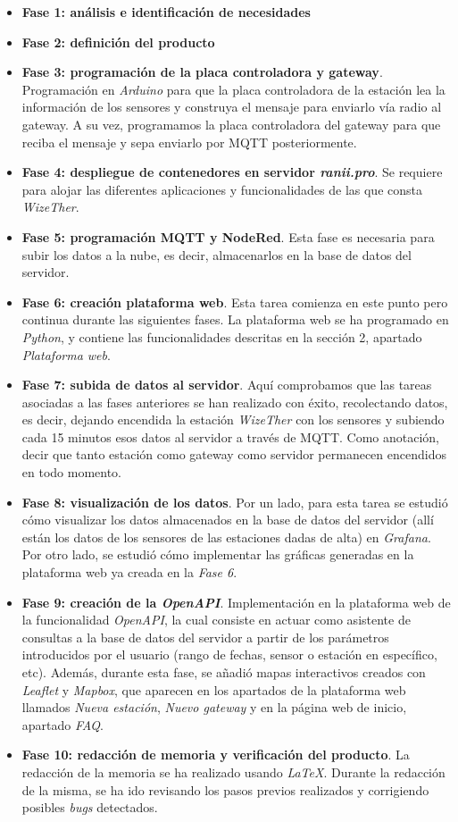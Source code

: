 \documentclass[12pt]{article}
\begin{document}
\begin{itemize}
	\item \textbf{Fase 1: análisis e identificación de necesidades}
	\item \textbf{Fase 2: definición del producto}
	\item \textbf{Fase 3: programación de la placa controladora y gateway}. Programación en \textit{Arduino} para que la placa controladora de la estación lea la información de los sensores y construya el mensaje para enviarlo vía radio al gateway. A su vez, programamos la placa controladora del gateway para que reciba el mensaje y sepa enviarlo por MQTT posteriormente.
	\item \textbf{Fase 4: despliegue de contenedores en servidor \textit{ranii.pro}}. Se requiere para alojar las diferentes aplicaciones y funcionalidades de las que consta \textit{WizeTher}.
	\item  \textbf{Fase 5: programación MQTT y NodeRed}. Esta fase es necesaria para subir los datos a la nube, es decir, almacenarlos en la base de datos del servidor.
	\item \textbf{Fase 6: creación plataforma web}. Esta tarea comienza en este punto pero continua durante las siguientes fases. La plataforma web se ha programado en \textit{Python}, y contiene las funcionalidades descritas en la sección 2, apartado \textit{Plataforma web}.
	\item \textbf{Fase 7: subida de datos al servidor}. Aquí comprobamos que las tareas asociadas a las fases anteriores se han realizado con éxito, recolectando datos, es decir, dejando encendida la estación \textit{WizeTher} con los sensores y subiendo cada 15 minutos esos datos al servidor a través de MQTT. Como anotación, decir que tanto estación como gateway como servidor permanecen encendidos en todo momento.
	\item \textbf{Fase 8: visualización de los datos}. Por un lado, para esta tarea se estudió cómo visualizar los datos almacenados en la base de datos del servidor (allí están los datos de los sensores de las estaciones dadas de alta) en \textit{Grafana}. Por otro lado, se estudió cómo implementar las gráficas generadas en la plataforma web ya creada en la \textit{Fase 6}.
	\item \textbf{Fase 9: creación de la \textit{OpenAPI}}. Implementación en la plataforma web de la funcionalidad \textit{OpenAPI}, la cual consiste en actuar como asistente de consultas a la base de datos del servidor a partir de los parámetros introducidos por el usuario (rango de fechas, sensor o estación en específico, etc). Además, durante esta fase, se añadió mapas interactivos creados con \textit{Leaflet} y \textit{Mapbox}, que aparecen en los apartados de la plataforma web llamados \textit{Nueva estación}, \textit{Nuevo gateway} y en la página web de inicio, apartado \textit{FAQ}.
	\item \textbf{Fase 10: redacción de memoria y verificación del producto}. La redacción de la memoria se ha realizado usando \textit{LaTeX}. Durante la redacción de la misma, se ha ido revisando los pasos previos realizados y corrigiendo posibles \textit{bugs} detectados.
\end{itemize}
\end{document}
